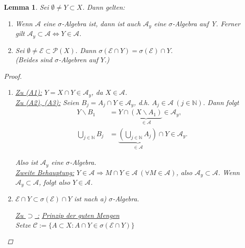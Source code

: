 \documentclass[a4paper]{scrreprt}
\newcommand{\PowerSet}{\mathcal{P}}
\newcommand{\N}{\mathbb{N}}
\newcommand{\jlabel}[1]{\label{j_#1}}
\newcommand{\jspacesmall}{\vspace{4pt}}
\theoremstyle{plain}
\newtheorem{lem}[thm]{Lemma}
\theoremstyle{definition}
\begin{document}
{{\begin{lem}
\jlabel{Lem 1.10}
    Sei $\emptyset \ne Y \subset X$. Dann gelten:
    \begin{enumerate}
        \item Wenn $\mathcal{A}$ eine $\sigma$-Algebra ist, dann ist auch $\mathcal{A}_y$ eine $\sigma$-Algebra auf Y. Ferner gilt $\mathcal{A}_y \subset \mathcal{A} \Leftrightarrow Y \in \mathcal{A}$.
        \item Sei $\emptyset \ne \mathcal{E} \subset \PowerSet(X)$. Dann $\sigma(\mathcal{E} \cap Y) = \sigma(\mathcal{E}) \cap Y$. \\
            (Beides sind $\sigma$-Algebren auf $Y$.)
    \end{enumerate}
    \begin{proof}
        \begin{enumerate}
            \item 
                \uline{Zu (A1):} $Y = X \cap Y \in \mathcal{A}_y$, da $X \in \mathcal{A}$.\\
                \uline{Zu (A2), (A3):} Seien $B_j = A_j \cap Y \in \mathcal{A}_y$, d.h. $A_j \in \mathcal{A} \ (j \in \N)$. Dann folgt
                \begin{displaymath}
                    \begin{split}
                        Y \backslash B_1 &= Y \cap \underbrace{(X \backslash A_1)}_{\in \mathcal{A}} \in \mathcal{A}_y,\\
                        \bigcup_{j\in \N} B_j &= \underbrace{( \bigcup_{j \in \N} A_j )}_{\in \mathcal{A}} \cap Y \in \mathcal{A}_y.
                    \end{split}
                \end{displaymath}

                Also ist $\mathcal{A}_y$ eine $\sigma$-Algebra.\\
                \uline{Zweite Behauptung:} $Y\in \mathcal{A} \Rightarrow M \cap Y \in \mathcal{A} \ (\forall M \in \mathcal{A})$, also $\mathcal{A}_y \subset \mathcal{A}$. Wenn $\mathcal{A}_y \subset \mathcal{A}$, folgt also $Y \in \mathcal{A}$.
                
            \item
                $\mathcal{E} \cap Y \subset \sigma(\mathcal{E}) \cap Y$ ist nach a) $\sigma$-Algebra.
                
                \jspacesmall
                
                \uline{Zu $\supset$ :} \uline{Prinzip der guten Mengen}\\
                Setze $\mathcal{C} := \{A \subset X : A \cap Y \in \sigma(\mathcal{E} \cap Y)\}$
                

\end{enumerate}
\end{proof}
\end{lem}}}
\end{document}
